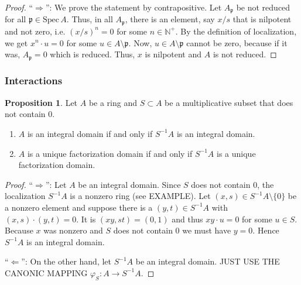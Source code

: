 \documentclass[a4paper]{book}
\theoremstyle{definition}
\newtheorem{proposition}[definition]{Proposition}
\begin{document}
\begin{proof}
    ``\(\Rightarrow\)'': We prove the statement by contrapositive. Let \(A_\mathfrak{p}\) be not reduced for all \(\mathfrak{p} \in \mathrm{Spec} \, A\). Thus, in all \(A_\mathfrak{p}\), there is an element, say \(x / s\) that is nilpotent and not zero, i.e. \((x / s)^n = 0\) for some \(n \in \mathbb{N}^+\). By the definition of localization, we get \(x^n \cdot u = 0\) for some \(u \in A \setminus \mathfrak{p}\). Now, \(u \in A \setminus \mathfrak{p}\) cannot be zero, because if it was, \(A_\mathfrak{p} = 0\) which is reduced. Thus, \(x\) is nilpotent and \(A\) is not reduced.
\end{proof}








\subsubsection*{Interactions}
\begin{thmbox}
    \begin{proposition}
        Let \(A\) be a ring and \(S \subset A\) be a multiplicative subset that does not contain \(0\).
        
        \begin{enumerate}
            \item \(A\) is an integral domain if and only if \(S^{-1}A\) is an integral domain.
            \item \(A\) is a unique factorization domain if and only if \(S^{-1}A\) is a unique factorization domain.
        \end{enumerate}
    \end{proposition}
\end{thmbox}



\begin{proof}
    ``\(\Rightarrow\)'': Let \(A\) be an integral domain. Since \(S\) does not contain \(0\), the localization \(S^{-1}A\) is a nonzero ring (see EXAMPLE). Let \((x, s) \in S^{-1}A \setminus \{0\}\) be a nonzero element and suppose there is a \((y, t) \in S^{-1}A\) with \((x, s) \cdot (y, t) = 0\). It is \((xy, st) = (0, 1)\) and thus \(xy \cdot u = 0\) for some \(u \in S\). Because \(x\) was nonzero and \(S\) does not contain \(0\) we must have \(y = 0\). Hence \(S^{-1}A\) is an integral domain.

    ``\(\Leftarrow\)'': On the other hand, let \(S^{-1}A\) be an integral domain. JUST USE THE CANONIC MAPPING \(\varphi_S: A \longrightarrow S^{-1}A\).
\end{proof}
\end{document}
